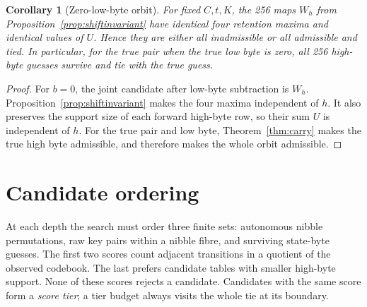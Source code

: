 \documentclass[10pt]{article}
\theoremstyle{plain}
\newtheorem{corollary}[theorem]{Corollary}
\theoremstyle{definition}
\theoremstyle{remark}
\begin{document}
\begin{corollary}[Zero-low-byte orbit]
\label{cor:zeroorbit}
For fixed \(C,t,K\), the 256 maps \(W_h\) from
Proposition~\ref{prop:shiftinvariant} have identical four retention maxima and
identical values of \(U\).  Hence they are either all
inadmissible or all admissible and tied.  In particular, for the true pair
when the true low byte is zero, all 256 high-byte guesses survive and tie with
the true guess.
\end{corollary}
\begin{proof}
For \(b=0\), the joint candidate after low-byte subtraction is \(W_h\).
Proposition~\ref{prop:shiftinvariant} makes the four maxima independent of
\(h\).  It also preserves the support
size of each forward high-byte row, so their sum \(U\) is independent of
\(h\).  For the true pair and low byte, Theorem~\ref{thm:carry} makes the true
high byte admissible, and therefore makes the whole orbit admissible.
\end{proof}

\section{Candidate ordering}
\label{sec:ranking}

At each depth the search must order three finite sets: autonomous nibble
permutations, raw key pairs within a nibble fibre, and surviving state-byte
guesses.  The first two scores count adjacent transitions in a quotient of the
observed codebook.  The last prefers candidate tables with smaller high-byte
support.  None of these scores rejects a candidate.
Candidates with the same score form a \emph{score tier}; a tier budget always
visits the whole tie at its boundary.
\end{document}
